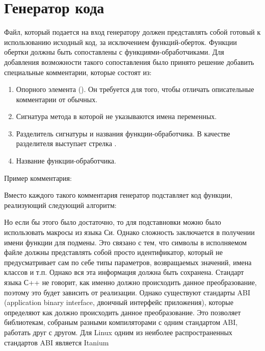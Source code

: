 \section{Генератор кода}

Файл, который подается на вход генератору должен представлять собой готовый к
использованию исходный код, за исключением функций-оберток. Функции обертки
должны быть сопоставлены с функциями-обработчиками. Для добавления возможности
такого сопоставления было принято решение добавить специальные комментарии,
которые состоят из:

\begin{enumerate}
	\item Опорного элемента (). Он требуется для того, чтобы
		отличать описательные комментарии от обычных.
	\item Сигнатура метода в которой не указываются имена переменных.
	\item Разделитель сигнатуры и названия функции-обработчика. В качестве
		разделителя выступает стрелка \code{->}.
	\item Название функции-обработчика.
\end{enumerate}

Пример комментария: 

Вместо каждого такого комментария генератор подставляет код функции, реализующий
следующий алгоритм:

\begin{algorithm}[H]
\end{algorithm}

Но если бы этого было достаточно, то для подставновки можно было использовать
макросы из языка Си. Однако сложность заключается в получении имени функции для
подмены. Это связано с тем, что символы в исполняемом файле должны представлять
собой просто идентификатор, который не предусматривает сам по себе типы
параметров, возвращаемых значений, имена классов и т.п.
Однако вся эта информация должна быть сохранена. Стандарт языка С++ не говорит,
как именно должно происходить данное преобразование, поэтому это будет зависить
от реализации. Однако существуют стандарты ABI (application binary interface,
двоичный интерфейс приложения), которые определяют как должно происходить данное
преобразование. Это позволяет библиотекам, собраным разными компиляторами с
одним стандартом ABI, работать друг с другом. Для Linux одним из неиболее
распространенных стандартов ABI является Itanium\cite{itaniumabi}

